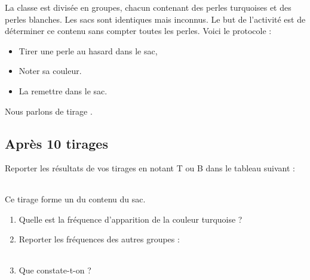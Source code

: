 
La classe est divisée en groupes, chacun contenant des perles turquoises et des perles blanches. Les sacs sont identiques mais inconnus. Le but de l'activité est de déterminer ce contenu sans compter toutes les perles. Voici le protocole :
\begin{itemize}
    \item Tirer une perle au hasard dans le sac,
    \item Noter sa couleur.
    \item La remettre dans le sac.
\end{itemize}
Nous parlons de tirage .

\subsection*{Après 10 tirages}

Reporter les résultats de vos tirages en notant T ou B dans le tableau suivant :

\begin{tabular}[]{|c|c|c|c|c|c|c|c|c|}
    \hline
    &&&&&&&&\\
    \hline
\end{tabular}

Ce tirage forme un  du contenu du sac.
\begin{enumerate}
    \item
        Quelle est la fréquence d'apparition de la couleur turquoise ?
     \item
        Reporter les fréquences des autres groupes :
        \begin{tabular}[]{|c|c|c|c|c|c|c|c|c|c|}
        \hline
        &&&&&&&&\\
        \hline
    \end{tabular}
\item
    Que constate-t-on ?
\end{enumerate}

